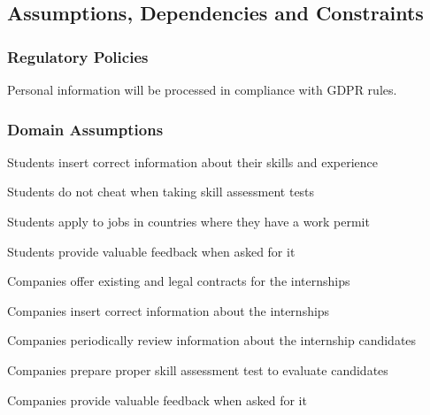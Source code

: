 
\subsection{Assumptions, Dependencies and Constraints}



\subsubsection{Regulatory Policies}
    Personal information will be processed in compliance with GDPR rules.


\subsubsection{Domain Assumptions}
    \begin{enumerate}[label={[D\arabic*]}]
        \item {Students insert correct information about their skills and experience}
        \item {Students do not cheat when taking skill assessment tests}
        \item {Students apply to jobs in countries where they have a work permit}
        \item {Students provide valuable feedback when asked for it}
        \item {Companies offer existing and legal contracts for the internships}
        \item {Companies insert correct information about the internships}
        \item {Companies periodically review information about the internship candidates}
        \item {Companies prepare proper skill assessment test to evaluate candidates}
        \item {Companies provide valuable feedback when asked for it}
    \end{enumerate}